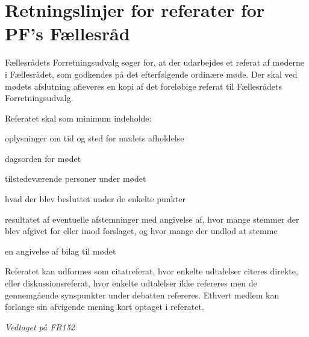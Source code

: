 \section{Retningslinjer for referater for PF’s Fællesråd}
\label{RetningslinjerForRefFR}
\begin{list}{•}
\item Fællesrådets Forretningsudvalg søger for, at der udarbejdes et referat af møderne i Fællesrådet, som godkendes
        på det efterfølgende ordinære møde. Der skal ved mødets afslutning afleveres en kopi af det foreløbige referat
             til Fællesrådets Forretningsudvalg.
\item Referatet skal som minimum indeholde:
\begin{list}{-}
\item oplysninger om tid og sted for mødets afholdelse
\item dagsorden for mødet
\item tilstedeværende personer under mødet
\item hvad der blev besluttet under de enkelte punkter
\item resultatet af eventuelle afstemninger med angivelse af, hvor mange stemmer der blev afgivet for eller imod forslaget, og hvor mange der undlod at stemme
\item en angivelse af bilag til mødet
\end{list}
\item Referatet kan udformes som citatreferat, hvor enkelte udtalelser citeres direkte, eller diskussionsreferat, hvor enkelte udtalelser ikke refereres men de gennemgående synspunkter under debatten refereres. Ethvert medlem kan forlange sin afvigende  mening kort optaget i referatet.

\end{list}

\textit{Vedtaget på FR152}
